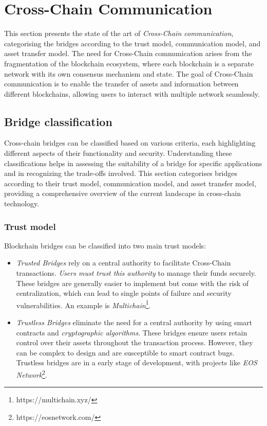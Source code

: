 \section{Cross-Chain Communication}
\label{sec:cross_chain_communication}

This section presents the state of the art of \textit{Cross-Chain communication}, categorising the bridges according to the trust model, communication model, and asset transfer model. The need for Cross-Chain communication arises from the fragmentation of the blockchain ecosystem, where each blockchain is a separate network with its own consensus mechanism and state. The goal of Cross-Chain communication is to enable the transfer of assets and information between different blockchains, allowing users to interact with multiple network seamlessly.

\subsection{Bridge classification}
\label{subsec:bridge_classification}

Cross-chain bridges can be classified based on various criteria, each highlighting different aspects of their functionality and security. Understanding these classifications helps in assessing the suitability of a bridge for specific applications and in recognizing the trade-offs involved. This section categorises bridges according to their trust model, communication model, and asset transfer model, providing a comprehensive overview of the current landscape in cross-chain technology. \cite{lifi-bridge}

\subsubsection{Trust model}
\label{subsubsec:trust_model}

Blockchain bridges can be classified into two main trust models: 
\begin{itemize}
    \item \textit{Trusted Bridges} rely on a central authority to facilitate Cross-Chain transactions. \textit{Users must trust this authority} to manage their funds securely. These bridges are generally easier to implement but come with the risk of centralization, which can lead to single points of failure and security vulnerabilities. \cite{immunebytes-trust-bridge} An example is \textit{Multichain}\footnote{https://multichain.xyz/}.
    \item \textit{Trustless Bridges} eliminate the need for a central authority by using smart contracts and \textit{cryptographic algorithms}. These bridges ensure users retain control over their assets throughout the transaction process. However, they can be complex to design and are susceptible to smart contract bugs. \cite{immunebytes-trust-bridge} Trustless bridges are in a early stage of development, with projects like \textit{EOS Network}\footnote{https://eosnetwork.com/}.
\end{itemize}

